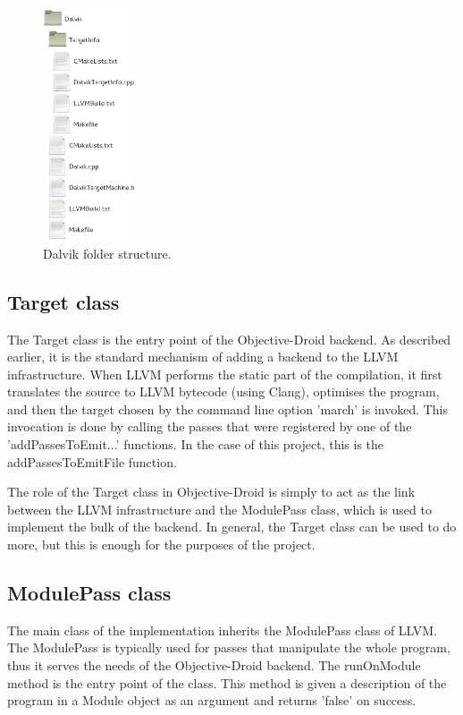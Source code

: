 \documentclass[parskip]{cs4rep}
\begin{document}
\begin{figure}[htb]
    \centering
        \includegraphics[width=0.24\textwidth]{dalvik-folder}
    \caption{Dalvik folder structure.}
    \label{fig:dalvikFolder}    
\end{figure}

\subsection{Target class}

The Target class is the entry point of the Objective-Droid backend. As described earlier, it is the standard mechanism of adding a backend to the LLVM infrastructure. When LLVM performs the static part of the compilation, it first translates the source to LLVM bytecode (using Clang), optimises the program, and then the target chosen by the command line option 'march' is invoked. This invocation is done by calling the passes that were registered by one of the 'addPassesToEmit...' functions. In the case of this project, this is the addPassesToEmitFile function.

The role of the Target class in Objective-Droid is simply to act as the link between the LLVM infrastructure and the ModulePass class, which is used to implement the bulk of the backend. In general, the Target class can be used to do more, but this is enough for the purposes of the project.

\subsection{ModulePass class} \label{sec:ModulePassClass}

The main class of the implementation inherits the ModulePass class of LLVM. The ModulePass is typically used for passes that manipulate the whole program, thus it serves the needs of the Objective-Droid backend. The runOnModule method is the entry point of the class. This method is given a description of the program in a Module object as an argument and returns 'false' on success.
\end{document}
